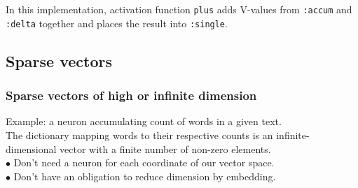 \documentclass{beamer}
\newcommand{\msmagenta}[1]{{\color{mymagenta} #1}}
\newcommand{\msgreen}[1]{{\color{mygreen} #1}}
\begin{document}
\begin{frame}

In this implementation, activation function \msgreen{\footnotesize \tt plus} adds V-values from 
{\footnotesize\tt :accum} and {\footnotesize\tt :delta}
together and places the result into {\footnotesize\tt :single}.

\end{frame}


\subsection{Sparse vectors}



\begin{frame}

  \frametitle{Sparse vectors of high or infinite dimension}

Example:  a neuron accumulating count of words in a given text.\\[2ex]

The dictionary mapping words to their respective counts is an infinite-dimensional vector
with a finite number of non-zero elements.\\[2ex]

\msmagenta{\Large $\bullet$} Don't need a neuron for each coordinate of our vector space.\\[2ex]

 \msmagenta{\Large $\bullet$} Don't have an obligation to reduce dimension by embedding.

\end{frame}
\end{document}
